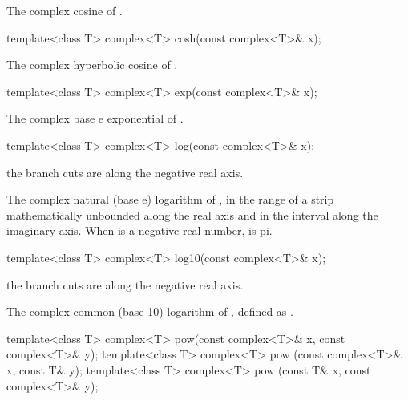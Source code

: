 \begin{itemdescr}
\pnum
\returns
The complex cosine of .
\end{itemdescr}

%
\begin{itemdecl}
template<class T> complex<T> cosh(const complex<T>& x);
\end{itemdecl}

\begin{itemdescr}
\pnum
\returns
The complex hyperbolic cosine of .
\end{itemdescr}

%
\begin{itemdecl}
template<class T> complex<T> exp(const complex<T>& x);
\end{itemdecl}

\begin{itemdescr}
\pnum
\returns
The complex base e exponential of .
\end{itemdescr}

%
\begin{itemdecl}
template<class T> complex<T> log(const complex<T>& x);
\end{itemdecl}

\begin{itemdescr}
\pnum
\notes
the branch cuts are along the negative real axis.

\pnum
\returns
The complex natural (base e) logarithm of ,
in the range of a strip mathematically unbounded along the
real axis and in the interval 
along the imaginary axis.
When  is a negative real
number,
is pi.
\end{itemdescr}

%
\begin{itemdecl}
template<class T> complex<T> log10(const complex<T>& x);
\end{itemdecl}

\begin{itemdescr}
\pnum
\notes
the branch cuts are along the negative real axis.

\pnum
\returns
The complex common (base 10) logarithm of , defined as
.
\end{itemdescr}

%
\begin{itemdecl}
template<class T>
  complex<T> pow(const complex<T>& x, const complex<T>& y);
template<class T> complex<T> pow  (const complex<T>& x, const T& y);
template<class T> complex<T> pow  (const T& x, const complex<T>& y);
\end{itemdecl}

